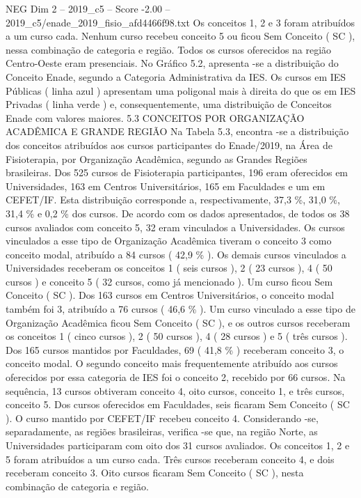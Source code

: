 \begin{textsample}{NEG Dim 2 – 2019\_c5 – Score -2.00 – 2019\_c5/enade\_2019\_fisio\_afd4466f98.txt}
Os conceitos 1, 2 e 3 foram atribuídos a um curso cada.
Nenhum curso recebeu conceito 5 ou ficou Sem Conceito ( SC ), nessa combinação de categoria e região.
Todos os cursos oferecidos na região Centro-Oeste eram presenciais.
No Gráfico 5.2, apresenta -se a distribuição do Conceito Enade, segundo a Categoria Administrativa da IES.
Os cursos em IES Públicas ( linha azul ) apresentam uma poligonal mais à direita do que os em IES Privadas ( linha verde ) e, consequentemente, uma distribuição de Conceitos Enade com valores maiores. 5.3 CONCEITOS POR ORGANIZAÇÃO ACADÊMICA E GRANDE REGIÃO Na Tabela 5.3, encontra -se a distribuição dos conceitos atribuídos aos cursos participantes do Enade/2019, na Área de Fisioterapia, por Organização Acadêmica, segundo as Grandes Regiões brasileiras.
Dos 525 cursos de Fisioterapia participantes, 196 eram oferecidos em Universidades, 163 em Centros Universitários, 165 em Faculdades e um em CEFET/IF.
Esta distribuição corresponde a, respectivamente, 37,3 \%, 31,0 \%, 31,4 \% e 0,2 \% dos cursos.
De acordo com os dados apresentados, de todos os 38 cursos avaliados com conceito 5, 32 eram vinculados a Universidades.
Os cursos vinculados a esse tipo de Organização Acadêmica tiveram o conceito 3 como conceito modal, atribuído a 84 cursos ( 42,9 \% ).
Os demais cursos vinculados a Universidades receberam os conceitos 1 ( seis cursos ), 2 ( 23 cursos ), 4 ( 50 cursos ) e conceito 5 ( 32 cursos, como já mencionado ).
Um curso ficou Sem Conceito ( SC ).
Dos 163 cursos em Centros Universitários, o conceito modal também foi 3, atribuído a 76 cursos ( 46,6 \% ).
Um curso vinculado a esse tipo de Organização Acadêmica ficou Sem Conceito ( SC ), e os outros cursos receberam os conceitos 1 ( cinco cursos ), 2 ( 50 cursos ), 4 ( 28 cursos ) e 5 ( três cursos ).
Dos 165 cursos mantidos por Faculdades, 69 ( 41,8 \% ) receberam conceito 3, o conceito modal.
O segundo conceito mais frequentemente atribuído aos cursos oferecidos por essa categoria de IES foi o conceito 2, recebido por 66 cursos.
Na sequência, 13 cursos obtiveram conceito 4, oito cursos, conceito 1, e três cursos, conceito 5.
Dos cursos oferecidos em Faculdades, seis ficaram Sem Conceito ( SC ).
O curso mantido por CEFET/IF recebeu conceito 4.
Considerando -se, separadamente, as regiões brasileiras, verifica -se que, na região Norte, as Universidades participaram com oito dos 31 cursos avaliados.
Os conceitos 1, 2 e 5 foram atribuídos a um curso cada.
Três cursos receberam conceito 4, e dois receberam conceito 3.
Oito cursos ficaram Sem Conceito ( SC ), nesta combinação de categoria e região.

\end{textsample}
